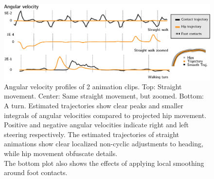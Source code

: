 \begin{figure}
    \centering
    \includegraphics[width=1.0\columnwidth]{img/estimated_trajectory_angular_velocity.png}
    \caption{Angular velocity profiles of 2 animation clips. Top: Straight movement. Center: Same straight movement, but zoomed. Bottom: A turn. Estimated trajectories show clear peaks and smaller integrals of angular velocities compared to projected hip movement. Positive and negative angular velocities indicate right and left steering respectively. The estimated trajectories of straight animations show clear localized non-cyclic adjustments to heading, while hip movement obfuscate details.\\The bottom plot also shows the effects of applying local smoothing around foot contacts.}
    \label{fig:results:estimatedtrajectory:stats}
\end{figure}


